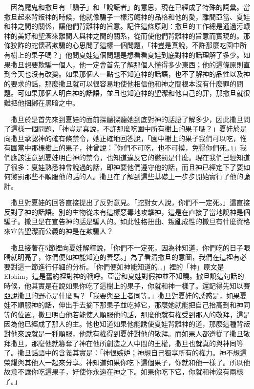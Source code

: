 \documentclass{book}
\begin{document}
　因為魔鬼和撒旦有「騙子」和「說謊者」的意思，現在已經成了特殊的詞彙。當撒旦起來背叛神的時候，他就像騙子一樣污衊神的品格和他的愛，離間亞當、夏娃和神之間的關係，讓他們背離神的旨意。記住這條原則：撒旦的工作總是通過污衊神的美好和聖潔來離間人與神之間的關系，從而使他們背離神的旨意而實現的。那條狡詐的蛇懷著欺騙的心思問了這樣一個問題，「神豈是真說，不許那麼吃園中所有樹上的果子嗎？」他問夏娃這個問題是想看看夏娃到底對神的話理解了多少。如果撒旦想要欺騙一個人，他一定會首先了解那個人懂得多少東西；他的這條原則直到今天也沒有改變。如果那個人一點也不知道神的話語，也不了解神的品性以及神的要求的話，那麼撒旦就可以很容易地使他相信他和神之間根本沒有什麼罪的問題。可如果那個人明白神的話語，並且也知道神的聖潔和他自己的罪，那撒旦就很難把他捆綁在黑暗之中。

　撒旦於是首先來到夏娃的面前探聽探聽她到底對神的話語了解多少，因此撒旦問了這樣一個問題，「神豈是真說，不許那麼吃園中所有樹上的果子嗎？」夏娃於是向撒旦承認神的確有條禁令，她正確地回答說，「園中樹上的果子我們可以吃，惟有園當中那棵樹上的果子，神曾說：『你們不可吃，也不可摸，免得你們死。』」我們應該注意到夏娃明白神的禁令，也知道違反它的懲罰是什麼。現在我們已經知道了很多：夏娃熟悉神曾說過的話，即神要他們遵守他的話，而且神已經定下了要如何懲罰那些不順服他的話的人。撒旦在了解到這些基礎上一步步開始實行了他的詭計。

　撒旦對夏娃的回答直接提出了反對意見。「蛇對女人說，你們不一定死。」這直接反對了神的話語。別的生物從未有這樣惡毒地攻擊神，這是在直接了當地說神是個騙子。撒旦是在宣告神的話是騙人的。如此性格扭曲、叛亂成性的撒旦有什麼資格來宣告聖潔而公義的神是在欺騙人？

　撒旦接著在5節裡向夏娃解釋說，「你們不一定死，因為神知道，你們吃的日子眼睛就明亮了，你們便如神能知道的善惡。」為了看清撒旦的意圖，我們在這裡有必要對這一節進行仔細的分析。「你們便如神能知道的…」裡的「神」原文是Elohim，這是舊約裡對神的稱呼。亞當和夏娃對假神並不知曉。撒旦說這句話的時候，他其實是在說如果你吃了這樹上的果子，你就和神一樣了。還記得先知以賽亞說撒旦的野心是什麼嗎？「我要與至上者同等。」撒旦對夏娃的誘惑是，如果夏娃不順服神的話，伸出手去摘下那果子並吃掉它，那麼她就能把自己抬高到和神同等的位置。撒旦明白他若能使人順服他的話，那麼他就有權受到那人的敬拜，這是因為他已經成了那人的主。他也知道如果他能誘使夏娃背離神的道，那麼這種背叛對他來說就是一種順服，他就有權得到夏娃對他的敬拜。而如果人都遵從了撒旦敬拜撒旦，那麼他就篡奪了神在他所創造之人中間的王權，撒旦也就真的與神同等了。撒旦話語中的含義其實是：「神很嫉妒；神想自己獨享所有的權力。神不想這榮耀與其他人一起來分享。神知道如果你吃下這個果子，你就和他一樣了。所以他故意不讓你吃這果子，好使你永遠在神之下。如果你吃下它，你就和神沒有兩樣了。」
\end{document}
